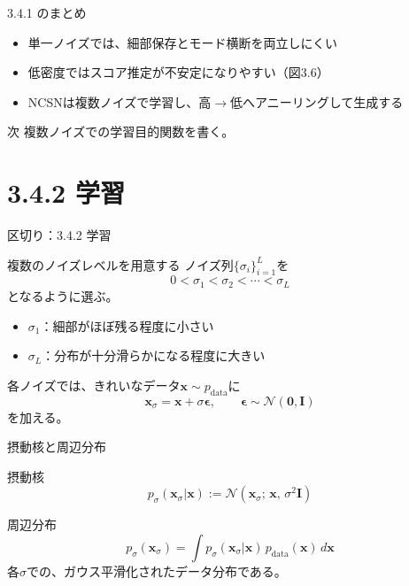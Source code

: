 \asmain
\begin{frame}{3.4.1 のまとめ}
    \begin{itemize}
        \item 単一ノイズでは、細部保存とモード横断を両立しにくい
        \item 低密度ではスコア推定が不安定になりやすい（図3.6）
        \item NCSNは複数ノイズで学習し、高$\to$低へアニーリングして生成する
    \end{itemize}
    \begin{block}{次}
        複数ノイズでの学習目的関数を書く。
    \end{block}
\end{frame}
\section{3.4.2 学習}
\asmain
\begin{frame}{区切り：3.4.2 学習}
    \tableofcontents[currentsection]
\end{frame}
\asmain
\begin{frame}{複数のノイズレベルを用意する}
    ノイズ列$\{\sigma_i\}_{i=1}^{L}$を
    \[
        0<\sigma_1<\sigma_2<\cdots<\sigma_L
    \]
    となるように選ぶ。
    \begin{itemize}
        \item $\sigma_1$：細部がほぼ残る程度に小さい
        \item $\sigma_L$：分布が十分滑らかになる程度に大きい
    \end{itemize}
    各ノイズでは、きれいなデータ$\bm{x}\sim p_{\mathrm{data}}$に
    \[
        \bm{x}_{\sigma}
        =
        \bm{x}+\sigma\bm{\epsilon},
        \qquad
        \bm{\epsilon}\sim\mathcal{N}(\bm{0},\bm{I})
    \]
    を加える。
\end{frame}
\asmain
\begin{frame}{摂動核と周辺分布}
    \begin{block}{摂動核}
        \[
            p_{\sigma}(\bm{x}_{\sigma}|\bm{x})
            :=
            \mathcal{N}(\bm{x}_{\sigma};\,\bm{x},\,\sigma^{2}\bm{I})
        \]
    \end{block}
    \begin{block}{周辺分布}
        \[
            p_{\sigma}(\bm{x}_{\sigma})
            =
            \int
            p_{\sigma}(\bm{x}_{\sigma}|\bm{x})\,
            p_{\mathrm{data}}(\bm{x})\,
            d\bm{x}
        \]
        各$\sigma$での、ガウス平滑化されたデータ分布である。
    \end{block}
\end{frame}
